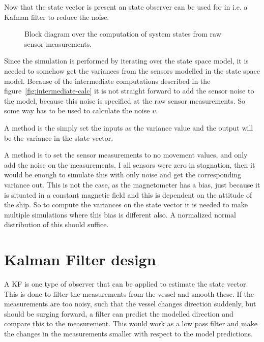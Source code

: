 Now that the state vector is present an state observer can be used for
in i.e. a Kalman filter to reduce the noise.

\begin{figure}
	\centering
	
	\caption{Block diagram over the computation of system states from
	raw sensor measurements.}
	\label{fig:intermediate-calc}
\end{figure}

Since the simulation is performed by iterating over the state space
model, it is needed to somehow get the variances from the sensors
modelled in the state space model. Because of the intermediate
computations described in the figure~\vref{fig:intermediate-calc} it
is not straight forward to add the sensor noise to the model, because
this noise is specified at the raw sensor measurements. So some way
has to be used to calculate the noise $v$.

A method is the simply set the inputs as the variance value and the
output will be the variance in the state vector. 

A method is to set the sensor measurements to no movement values, and
only add the noise on the measurements. I all sensors were zero in
stagnation, then it would be enough to simulate this with only noise and
get the corresponding variance out. This is not the case, as the
magnetometer has a bias, just because it is situated in a constant
magnetic field and this is dependent on the attitude of the ship. So
to compute the variances on the state vector it is needed to make
multiple simulations where this bias is different also. A normalized
normal distribution of this should suffice. 

\section{Kalman Filter design}

A \ac{KF} is one type of observer that can be applied to estimate the state vector. This is done to filter the measurements from the vessel and smooth these. If the measurements are too noisy, such that the vessel changes direction suddenly, but should be surging forward, a filter can predict the modelled direction and compare this to the measurement. This would work as a low pass filter and make the changes in the measurements smaller with respect to the model predictions.

